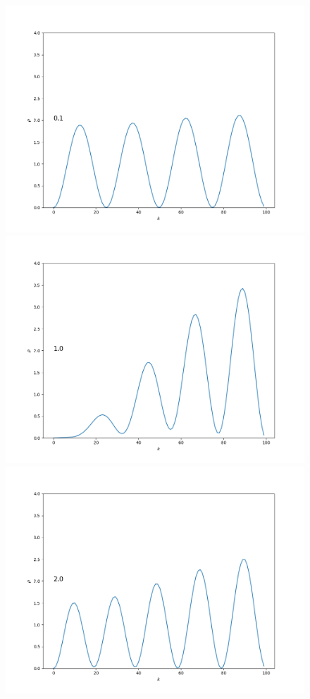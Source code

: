 \documentclass[11pt,a4paper]{article}
\begin{document}
\begin{figure}[ht!]
    \centering
    \begin{multicols}{3}
        \includegraphics[width=\linewidth]{../figures/frame_n=4_time=0.1.png}
        \includegraphics[width=\linewidth]{../figures/frame_n=4_time=1.0.png}
        \includegraphics[width=\linewidth]{../figures/frame_n=4_time=2.0.png}

\end{multicols}
\end{figure}
\end{document}
